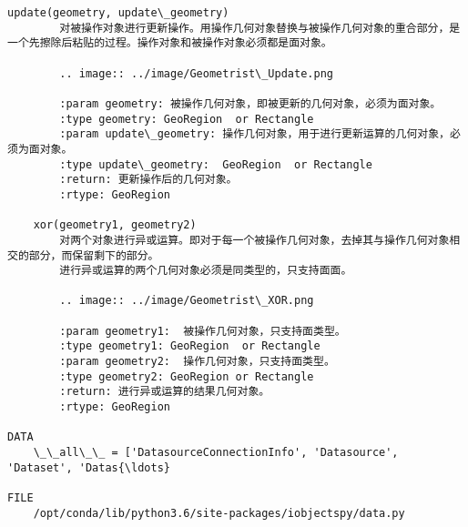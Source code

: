 \documentclass[11pt]{article}
\begin{document}
\begin{Verbatim}[commandchars=\\\{\}]
    update(geometry, update\_geometry)
        对被操作对象进行更新操作。用操作几何对象替换与被操作几何对象的重合部分，是一个先擦除后粘贴的过程。操作对象和被操作对象必须都是面对象。
        
        .. image:: ../image/Geometrist\_Update.png
        
        :param geometry: 被操作几何对象，即被更新的几何对象，必须为面对象。
        :type geometry: GeoRegion  or Rectangle
        :param update\_geometry: 操作几何对象，用于进行更新运算的几何对象，必须为面对象。
        :type update\_geometry:  GeoRegion  or Rectangle
        :return: 更新操作后的几何对象。
        :rtype: GeoRegion
    
    xor(geometry1, geometry2)
        对两个对象进行异或运算。即对于每一个被操作几何对象，去掉其与操作几何对象相交的部分，而保留剩下的部分。
        进行异或运算的两个几何对象必须是同类型的，只支持面面。
        
        .. image:: ../image/Geometrist\_XOR.png
        
        :param geometry1:  被操作几何对象，只支持面类型。
        :type geometry1: GeoRegion  or Rectangle
        :param geometry2:  操作几何对象，只支持面类型。
        :type geometry2: GeoRegion or Rectangle
        :return: 进行异或运算的结果几何对象。
        :rtype: GeoRegion

DATA
    \_\_all\_\_ = ['DatasourceConnectionInfo', 'Datasource', 'Dataset', 'Datas{\ldots}

FILE
    /opt/conda/lib/python3.6/site-packages/iobjectspy/data.py



    \end{Verbatim}


    
    
    
    
\end{document}
